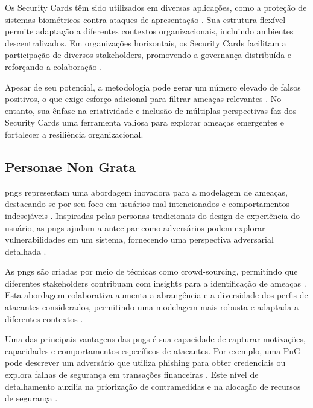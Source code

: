 Os Security Cards têm sido utilizados em diversas aplicações, como a
proteção de sistemas biométricos contra ataques de apresentação
\cite{AttackTreesforProtectingBiometric}. Sua estrutura flexível
permite adaptação a diferentes contextos organizacionais, incluindo
ambientes descentralizados. Em organizações horizontais, os Security
Cards facilitam a participação de diversos stakeholders, promovendo a
governança distribuída e reforçando a colaboração
\cite{CyberThreatModeling}.

Apesar de seu potencial, a metodologia pode gerar um número elevado de
falsos positivos, o que exige esforço adicional para filtrar ameaças
relevantes \cite{KeepingAheadofOurAdversaries}. No entanto, sua ênfase
na criatividade e inclusão de múltiplas perspectivas faz dos Security
Cards uma ferramenta valiosa para explorar ameaças emergentes e
fortalecer a resiliência organizacional.

\subsection{Personae Non Grata}
\label{subsec:personae_non_grata}

\gls{pngs} representam uma abordagem inovadora para a
modelagem de ameaças, destacando-se por seu foco em usuários
mal-intencionados e comportamentos indesejáveis
\cite{PersonaeNonGratae}. Inspiradas pelas personas tradicionais do
design de experiência do usuário, as \gls{pngs} ajudam a antecipar como
adversários podem explorar vulnerabilidades em um sistema, fornecendo
uma perspectiva adversarial detalhada
\cite{PnGRequirementsPhaseThreatModeling}.

As \gls{pngs} são criadas por meio de técnicas como crowd-sourcing,
permitindo que diferentes stakeholders contribuam com insights para a
identificação de ameaças \cite{PnGRequirementsPhaseThreatModeling}.
Esta abordagem colaborativa aumenta a abrangência e a diversidade dos
perfis de atacantes considerados, permitindo uma modelagem mais
robusta e adaptada a diferentes contextos \cite{PersonaeNonGratae}.

Uma das principais vantagens das \gls{pngs} é sua capacidade de capturar
motivações, capacidades e comportamentos específicos de atacantes. Por
exemplo, uma PnG pode descrever um adversário que utiliza phishing
para obter credenciais ou explora falhas de segurança em transações
financeiras \cite{PersonaeNonGratae}. Este nível de detalhamento
auxilia na priorização de contramedidas e na alocação de recursos de
segurança \cite{PnGRequirementsPhaseThreatModeling}.

